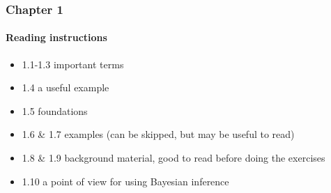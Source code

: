\documentclass[english,t]{beamer}
\begin{document}
\begin{frame}
  \frametitle{Chapter 1}  %
  \framesubtitle{Reading instructions}
  \begin{itemize}
\item 1.1-1.3 important terms
\item 1.4 a useful example
\item 1.5 foundations
\item 1.6 \& 1.7 examples (can be skipped, but may be useful to read)
\item 1.8 \& 1.9 background material, good to read before doing the exercises
\item 1.10 a point of view for using Bayesian inference
  \end{itemize}

\end{frame}
\end{document}
